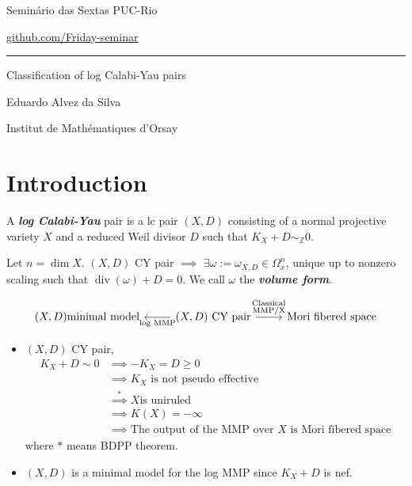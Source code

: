 


\begin{minipage}{\textwidth}
	\begin{minipage}{1\textwidth}
		Semin\'ario das Sextas \hfill PUC-Rio
		
		{\small\hfill\href{https://github.com/Friday-seminar/}{github.com/Friday-seminar}}
	\end{minipage}
\end{minipage}\vspace{.2cm}\hrule

\vspace{10pt}

{\Huge Classification of log Calabi-Yau pairs}

\hfill{\Large Eduardo Alvez da Silva}

\hfill{\large Institut de Mathématiques d'Orsay}

\tableofcontents

\section{Introduction}


\begin{defn}
	A \textit{\textbf{log Calabi-Yau}} pair is a lc pair  $(X,D)$ consisting of a normal projective variety $X$ and a reduced Weil divisor $D$ such that $K_X+D\sim_{\mathbb{Z}}0$.
\end{defn}

\begin{remark}
	Let $n=\dim X$. $(X,D)$ CY pair $\implies $ $\exists \omega:=\omega_{X,D}\in\Omega^n_x$, unique up to nonzero scaling such that $\operatorname{div}(\omega)+D=0$. We call $\omega$ the \textit{\textbf{volume form}}.
\end{remark}

\[\begin{tikzcd}
	(X,D)\text{minimal model}& \arrow[l,"\text{log MMP}" ](X,D)\text{ CY pair} \arrow[r,"\substack{\text{Classical}\\\text{MMP/X}}"  ]&\text{Mori fibered space} 
\end{tikzcd}\]

\begin{itemize}
	\item $(X,D)$ CY pair,
\begin{align*}
	K_{X}+D\sim 0 &\implies -K_X=D\geq 0\\
	&\implies K_X\text{ is not pseudo effective}\\
	&\overset{*}{\implies } X \text{is uniruled}\\
	&\implies K(X)=-\infty\\
	&\implies \text{The output of the  MMP over $X$ is Mori fibered space} 
\end{align*}
where $*$ means BDPP theorem.

	\item $(X,D)$ is a minimal model for the log MMP since $K_X+D$ is nef.
\end{itemize}

